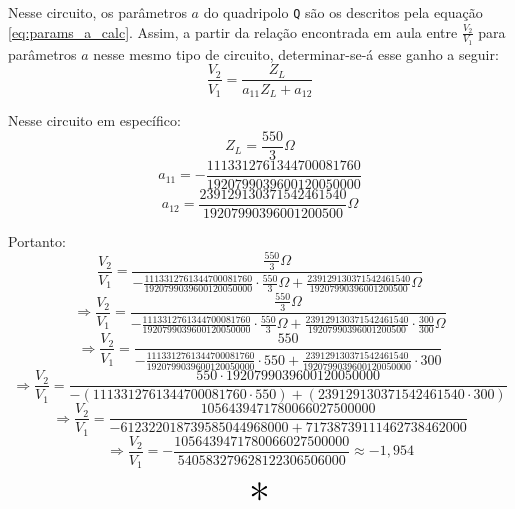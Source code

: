 \documentclass{report}
\begin{document}
Nesse circuito, os parâmetros $ a $ do quadripolo \texttt{Q} são os descritos pela equação \ref{eq:params_a_calc}. Assim, a partir da 
relação encontrada em aula entre $ \frac{V_2}{V_1} $ para parâmetros $ a $ nesse mesmo tipo de circuito, determinar-se-á esse ganho a seguir:
$$ \frac{V_2}{V_1} = \frac{Z_L}{a_{11}Z_L + a_{12}} $$

Nesse circuito em específico:
$$ Z_L = \frac{550}{3}\Omega $$
$$ a_{11} = - \frac{1113312761344700081760}{1920799039600120050000} $$
$$ a_{12} = \frac{239129130371542461540}{19207990396001200500} \Omega $$

Portanto:
$$ \frac{V_2}{V_1} = \frac{\frac{550}{3}\Omega}{- \frac{1113312761344700081760}{1920799039600120050000} \cdot \frac{550}{3}\Omega + \frac{239129130371542461540}{19207990396001200500} \Omega} $$
$$ \Rightarrow \frac{V_2}{V_1} = \frac{\frac{550}{3}\Omega}{- \frac{1113312761344700081760}{1920799039600120050000} \cdot \frac{550}{3}\Omega + \frac{239129130371542461540}{19207990396001200500} \cdot \frac{300}{300} \Omega} $$
$$ \Rightarrow \frac{V_2}{V_1} = \frac{550}{- \frac{1113312761344700081760}{1920799039600120050000} \cdot 550 + \frac{239129130371542461540}{1920799039600120050000} \cdot 300} $$
$$ \Rightarrow \frac{V_2}{V_1} = \frac{550 \cdot 1920799039600120050000}{- (1113312761344700081760 \cdot 550) + (239129130371542461540 \cdot 300)} $$
$$ \Rightarrow \frac{V_2}{V_1} = \frac{1056439471780066027500000}{- 612322018739585044968000 + 71738739111462738462000} $$
$$ \Rightarrow \frac{V_2}{V_1} = - \frac{1056439471780066027500000}{540583279628122306506000} \approx - 1,\!954 $$

\begin{center}
  \[ \scalebox{3}{$ * $} \]
\end{center}
\end{document}
